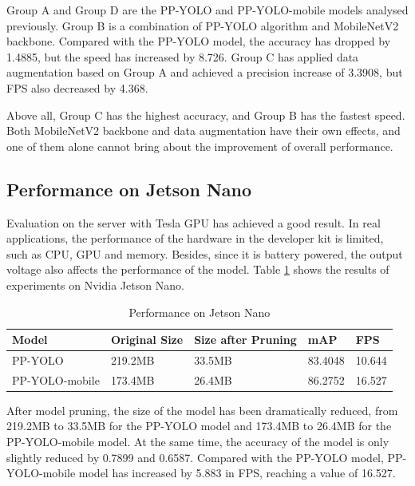 \documentclass[journal,article,submit,moreauthors,pdftex]{Definitions/mdpi}
\begin{document}
Group A and Group D are the PP-YOLO and PP-YOLO-mobile models analysed previously. Group B is a combination of PP-YOLO algorithm and MobileNetV2 backbone. Compared with the PP-YOLO model, the accuracy has dropped by 1.4885, but the speed has increased by 8.726. Group C has applied data augmentation based on Group A and achieved a precision increase of 3.3908, but FPS also decreased by 4.368.

Above all, Group C has the highest accuracy, and Group B has the fastest speed. Both MobileNetV2 backbone and data augmentation have their own effects, and one of them alone cannot bring about the improvement of overall performance.


\subsection{Performance on Jetson Nano}
Evaluation on the server with Tesla GPU has achieved a good result. In real applications, the performance of the hardware in the developer kit is limited, such as CPU, GPU and memory. Besides, since it is battery powered, the output voltage also affects the performance of the model. Table \ref{tbl:Performance on Jetson Nan} shows the results of experiments on Nvidia Jetson Nano.


\begin{table}[htbp]
\centering
\caption{Performance on Jetson Nano}
\begin{tabular}{lllll} 
\toprule
\textbf{Model}&\textbf{Original Size}&\textbf{Size after Pruning}&\textbf{mAP}&\textbf{FPS}\\
\midrule
PP-YOLO  & 219.2MB&33.5MB&83.4048&10.644\\
PP-YOLO-mobile &173.4MB & 26.4MB&86.2752&16.527\\
\bottomrule
\end{tabular}
\label{tbl:Performance on Jetson Nan}
\end{table}


After model pruning, the size of the model has been dramatically reduced, from 219.2MB to 33.5MB for the PP-YOLO model and 173.4MB to 26.4MB for the PP-YOLO-mobile model. At the same time, the accuracy of the model is only slightly reduced by 0.7899 and 0.6587. Compared with the PP-YOLO model, PP-YOLO-mobile model has increased by 5.883 in FPS, reaching a value of 16.527.
\end{document}
